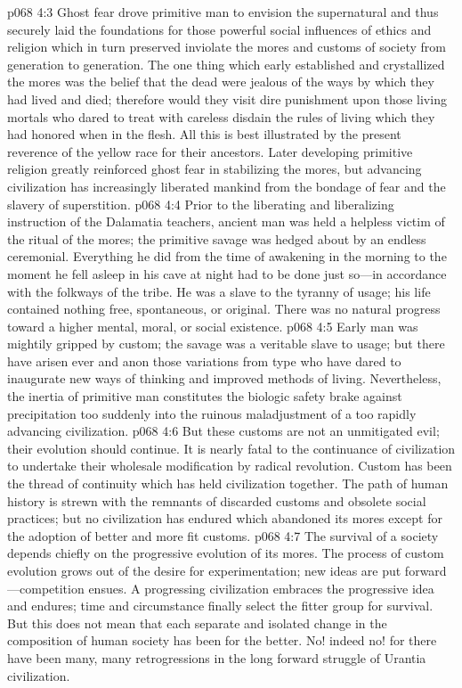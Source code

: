 \pc \vs p068 4:3 Ghost fear drove primitive man to envision the supernatural and thus securely laid the foundations for those powerful social influences of ethics and religion which in turn preserved inviolate the mores and customs of society from generation to generation. The one thing which early established and crystallized the mores was the belief that the dead were jealous of the ways by which they had lived and died; therefore would they visit dire punishment upon those living mortals who dared to treat with careless disdain the rules of living which they had honored when in the flesh. All this is best illustrated by the present reverence of the yellow race for their ancestors. Later developing primitive religion greatly reinforced ghost fear in stabilizing the mores, but advancing civilization has increasingly liberated mankind from the bondage of fear and the slavery of superstition.
\vs p068 4:4 Prior to the liberating and liberalizing instruction of the Dalamatia teachers, ancient man was held a helpless victim of the ritual of the mores; the primitive savage was hedged about by an endless ceremonial. Everything he did from the time of awakening in the morning to the moment he fell asleep in his cave at night had to be done just so---in accordance with the folkways of the tribe. He was a slave to the tyranny of usage; his life contained nothing free, spontaneous, or original. There was no natural progress toward a higher mental, moral, or social existence.
\vs p068 4:5 Early man was mightily gripped by custom; the savage was a veritable slave to usage; but there have arisen ever and anon those variations from type who have dared to inaugurate new ways of thinking and improved methods of living. Nevertheless, the inertia of primitive man constitutes the biologic safety brake against precipitation too suddenly into the ruinous maladjustment of a too rapidly advancing civilization.
\vs p068 4:6 But these customs are not an unmitigated evil; their evolution should continue. It is nearly fatal to the continuance of civilization to undertake their wholesale modification by radical revolution. Custom has been the thread of continuity which has held civilization together. The path of human history is strewn with the remnants of discarded customs and obsolete social practices; but no civilization has endured which abandoned its mores except for the adoption of better and more fit customs.
\vs p068 4:7 The survival of a society depends chiefly on the progressive evolution of its mores. The process of custom evolution grows out of the desire for experimentation; new ideas are put forward---competition ensues. A progressing civilization embraces the progressive idea and endures; time and circumstance finally select the fitter group for survival. But this does not mean that each separate and isolated change in the composition of human society has been for the better. No! indeed no! for there have been many, many retrogressions in the long forward struggle of Urantia civilization.
